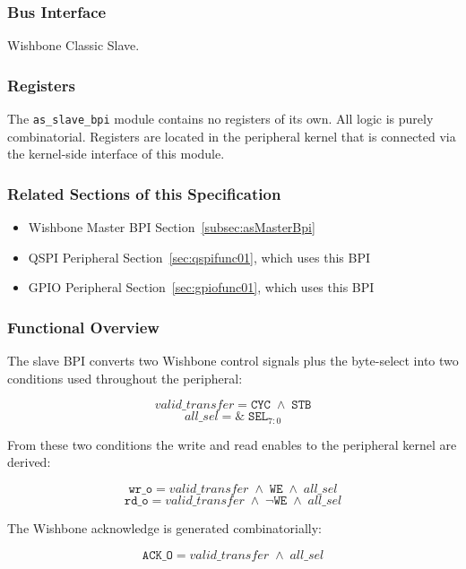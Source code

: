 \subsubsection{Bus Interface}

Wishbone Classic Slave.

\subsubsection{Registers}

The \texttt{as\_slave\_bpi} module contains no registers of its own.
All logic is purely combinatorial.
Registers are located in the peripheral kernel that is connected via the
kernel-side interface of this module.

\subsubsection{Related Sections of this Specification}

\begin{itemize}
  \item Wishbone Master BPI Section~\ref{subsec:asMasterBpi}
  \item QSPI Peripheral Section~\ref{sec:qspifunc01}, which uses this BPI
  \item GPIO Peripheral Section~\ref{sec:gpiofunc01}, which uses this BPI
\end{itemize}

\subsubsection{Functional Overview}

The slave BPI converts two Wishbone control signals plus the byte-select
into two conditions used throughout the peripheral:

\[
  \textit{valid\_transfer} = \texttt{CYC} \;\land\; \texttt{STB}
\]
\[
  \textit{all\_sel} = \&\;\texttt{SEL}_{7:0}
\]

From these two conditions the write and read enables to the peripheral
kernel are derived:

\[
  \texttt{wr\_o} = \textit{valid\_transfer} \;\land\; \texttt{WE} \;\land\; \textit{all\_sel}
\]
\[
  \texttt{rd\_o} = \textit{valid\_transfer} \;\land\; \lnot\texttt{WE} \;\land\; \textit{all\_sel}
\]

The Wishbone acknowledge is generated combinatorially:

\[
  \texttt{ACK\_O} = \textit{valid\_transfer} \;\land\; \textit{all\_sel}
\]


